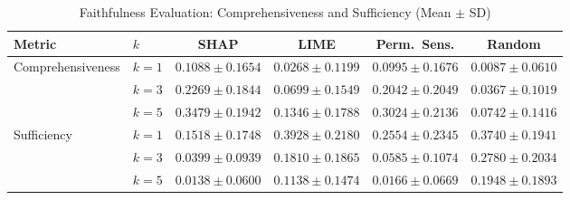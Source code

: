 \begin{table}[t]
\centering
\caption{Faithfulness Evaluation: Comprehensiveness and Sufficiency (Mean $\pm$ SD)}
\label{tab:faithfulness}
\begin{tabular}{llcccc}
\toprule
\textbf{Metric} & \textbf{$k$} & \textbf{SHAP} & \textbf{LIME} & \textbf{Perm.\ Sens.} & \textbf{Random} \\
\midrule
Comprehensiveness & $k=1$ & $0.1088 \pm 0.1654$ & $0.0268 \pm 0.1199$ & $0.0995 \pm 0.1676$ & $0.0087 \pm 0.0610$ \\
 & $k=3$ & $0.2269 \pm 0.1844$ & $0.0699 \pm 0.1549$ & $0.2042 \pm 0.2049$ & $0.0367 \pm 0.1019$ \\
 & $k=5$ & $0.3479 \pm 0.1942$ & $0.1346 \pm 0.1788$ & $0.3024 \pm 0.2136$ & $0.0742 \pm 0.1416$ \\
\midrule
Sufficiency & $k=1$ & $0.1518 \pm 0.1748$ & $0.3928 \pm 0.2180$ & $0.2554 \pm 0.2345$ & $0.3740 \pm 0.1941$ \\
 & $k=3$ & $0.0399 \pm 0.0939$ & $0.1810 \pm 0.1865$ & $0.0585 \pm 0.1074$ & $0.2780 \pm 0.2034$ \\
 & $k=5$ & $0.0138 \pm 0.0600$ & $0.1138 \pm 0.1474$ & $0.0166 \pm 0.0669$ & $0.1948 \pm 0.1893$ \\
\bottomrule
\end{tabular}
\end{table}